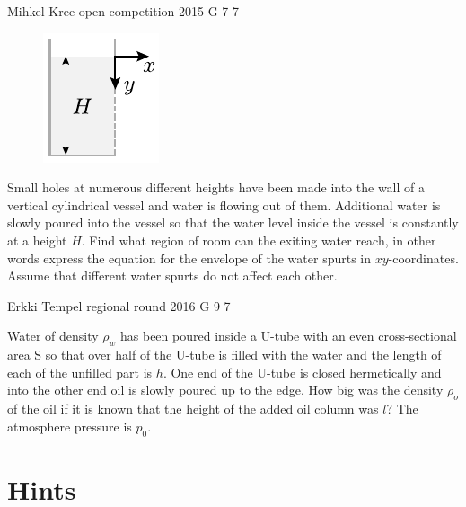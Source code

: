 \documentclass[11pt]{article}
\begin{document}
{Mihkel Kree} %
{open competition} %
{2015} %
{G 7} %
{7} %
{

\ifEngStatement
\begin{figure}%
\vspace{-15pt}
\includegraphics[width=\linewidth]{2015-lahg-07-veejoadJoon}%
\end{figure}
Small holes at numerous different heights have been made into the wall of a vertical cylindrical vessel and water is flowing out of them. Additional water is slowly poured into the vessel so that the water level inside the vessel is constantly at a height $H$. Find what region of room can the exiting water reach, in other words express the equation for the envelope of the water spurts in $xy$-coordinates. Assume that different water spurts do not affect each other.
\fi
}

{Erkki Tempel} %
{regional round} %
{2016} %
{G 9} %
{7} %
{

\ifEngStatement
Water of density $\rho_w$ has been poured inside a U-tube with an even cross-sectional area S so that over half of the U-tube is filled with the water and the length of each of the unfilled part is $h$. One end of the U-tube is closed hermetically and into the other end oil is slowly poured up to the edge. How big was the density $\rho_{o}$ of the oil if it is known that the height of the added oil column was $l$? The atmosphere pressure is $p_0$.
\fi
}
\newpage\normalsize\section{Hints}
        \ToggleEngHint
        
\end{document}
